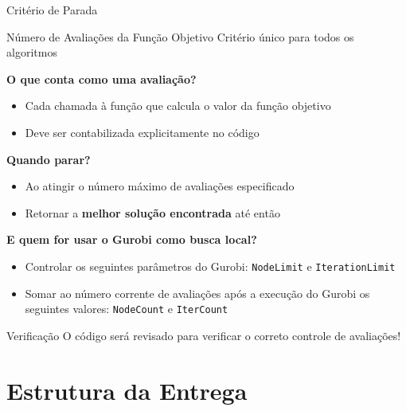 \documentclass[10pt]{beamer}
\begin{document}
\begin{frame}{Critério de Parada}
    \begin{block}{Número de Avaliações da Função Objetivo}
        Critério único para todos os algoritmos
    \end{block}
    
    \textbf{O que conta como uma avaliação?}
    \begin{itemize}
        \item Cada chamada à função que calcula o valor da função objetivo
        \item Deve ser contabilizada explicitamente no código
    \end{itemize}
    
    \textbf{Quando parar?}
    \begin{itemize}
        \item Ao atingir o número máximo de avaliações especificado
        \item Retornar a \textbf{melhor solução encontrada} até então
    \end{itemize}

    \textbf{E quem for usar o Gurobi como busca local?}
    \begin{itemize}
        \item Controlar os seguintes parâmetros do Gurobi: \texttt{NodeLimit} e \texttt{IterationLimit}
        \item Somar ao número corrente de avaliações após a execução do Gurobi os seguintes valores: \texttt{NodeCount} e \texttt{IterCount}
    \end{itemize}

    \begin{alertblock}{Verificação}
        O código será revisado para verificar o correto controle de avaliações!
    \end{alertblock}
\end{frame}

\section{Estrutura da Entrega}
\end{document}
